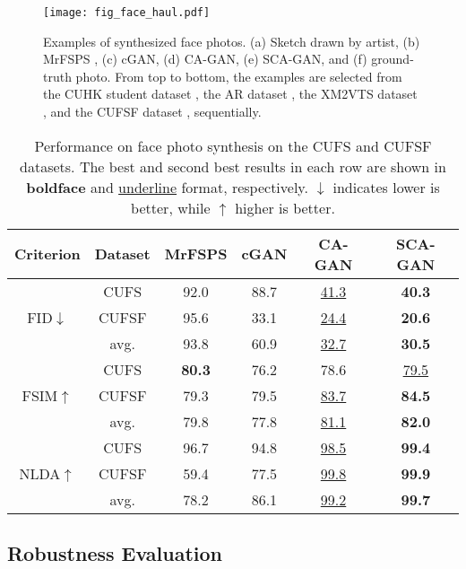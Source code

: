 \documentclass[journal]{IEEEtran}
\begin{document}
\begin{figure}
\centering
\texttt{[image: fig\_face\_haul.pdf]}
   \vspace{-0.4cm}
\caption{Examples of synthesized face photos. (a) Sketch drawn by artist, (b) MrFSPS \cite{Peng2016Multiple}, (c) cGAN, (d) CA-GAN, (e) SCA-GAN, and (f) ground-truth photo. From top to bottom, the examples are selected from the CUHK student dataset \cite{Ref2}, the AR dataset \cite{Ref23}, the XM2VTS dataset \cite{Ref24}, and the CUFSF dataset \cite{Ref32}, sequentially.}
\label{fig:sketch2photo}
\end{figure}


\begin{table}
\centering
\caption{Performance on face photo synthesis on the CUFS and CUFSF datasets. The best and second best results in each row are shown in \textbf{boldface} and \underline{underline} format, respectively.  $\downarrow$ indicates lower is better, while $\uparrow$ higher is better.}
\footnotesize
\label{tab:pfm_photo}
\begin{tabular}{c|c|cccc}
\toprule
Criterion	&	Dataset	&	MrFSPS & cGAN	&	CA-GAN	&	SCA-GAN	\\
\midrule									
	&	CUFS	&	92.0 &	88.7	&	\underline{41.3}	&	\textbf{40.3} 	\\
FID$\downarrow$	&	CUFSF	&	95.6 &	33.1	&	\underline{24.4}	&	\textbf{20.6}	\\
	& avg. & 93.8 & 60.9 & \underline{32.7} & \textbf{30.5} \\
\midrule
	&	CUFS	&	\textbf{80.3} &	76.2 	&	78.6 	&	\underline{79.5} 	\\
FSIM$\uparrow$&	CUFSF	& 79.3	&	79.5 	&	 \underline{83.7} 	&	\textbf{84.5} 	\\
	& avg.		&	79.8 & 77.8 & \underline{81.1}  & \textbf{82.0} \\
\midrule
	&	CUFS		&	96.7 &	94.8 	&	\underline{98.5} 	&	\textbf{99.4} 	\\
NLDA$\uparrow$&	CUFSF	&	59.4 &	77.5 	&	\underline{99.8}  	&	\textbf{ 99.9 } 	\\
	& avg. &  78.2 & 86.1 &  \underline{99.2} & \textbf{99.7} \\
\bottomrule							
\end{tabular}
\vspace{-0.5cm}
\end{table}


\subsection{Robustness Evaluation}
\label{sec:crossdataset}
\end{document}
